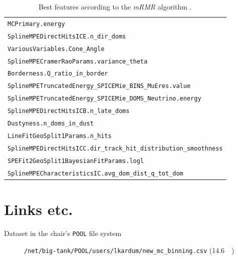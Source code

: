 \begin{table}
    \centering
    \caption{Best features according to the \emph{mRMR} algorithm \cite{dsea_jan}.}
    \label{tab:features}
    \begin{tabular}{l}
        \toprule
        \texttt{MCPrimary.energy} \\
        \texttt{SplineMPEDirectHitsICE.n\_dir\_doms} \\
        \texttt{VariousVariables.Cone\_Angle} \\
        \texttt{SplineMPECramerRaoParams.variance\_theta} \\
        \texttt{Borderness.Q\_ratio\_in\_border} \\
        \texttt{SplineMPETruncatedEnergy\_SPICEMie\_BINS\_MuEres.value} \\
        \texttt{SplineMPETruncatedEnergy\_SPICEMie\_DOMS\_Neutrino.energy} \\
        \texttt{SplineMPEDirectHitsICB.n\_late\_doms} \\
        \texttt{Dustyness.n\_doms\_in\_dust} \\
        \texttt{LineFitGeoSplit1Params.n\_hits} \\
        \texttt{SplineMPEDirectHitsICC.dir\_track\_hit\_distribution\_smoothness} \\
        \texttt{SPEFit2GeoSplit1BayesianFitParams.logl} \\
        \texttt{SplineMPECharacteristicsIC.avg\_dom\_dist\_q\_tot\_dom} \\
        \bottomrule
    \end{tabular}
\end{table}


\section{Links etc.}
\begin{description}
    \item[Dataset in the chair's \texttt{POOL} file system] \texttt{/net/big-tank/POOL/users/lkardum/new\_mc\_binning.csv} (\SI{14.6}{\giga\byte})
\end{description}
